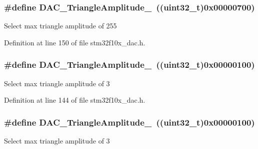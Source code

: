 \subsubsection[{\texorpdfstring{D\+A\+C\+\_\+\+Triangle\+Amplitude\+\_\+255}{DAC_TriangleAmplitude_255}}]{\setlength{\rightskip}{0pt plus 5cm}\#define D\+A\+C\+\_\+\+Triangle\+Amplitude\+\_~(({\bf uint32\+\_\+t})0x00000700)}\hypertarget{group___d_a_c__lfsrunmask__triangleamplitude_gadb404422c86a7b92d78e6d9617e8ce4d}{}\label{group___d_a_c__lfsrunmask__triangleamplitude_gadb404422c86a7b92d78e6d9617e8ce4d}
Select max triangle amplitude of 255 

Definition at line 150 of file stm32f10x\+\_\+dac.\+h.

\subsubsection[{\texorpdfstring{D\+A\+C\+\_\+\+Triangle\+Amplitude\+\_\+3}{DAC_TriangleAmplitude_3}}]{\setlength{\rightskip}{0pt plus 5cm}\#define D\+A\+C\+\_\+\+Triangle\+Amplitude\+\_~(({\bf uint32\+\_\+t})0x00000100)}\hypertarget{group___d_a_c__lfsrunmask__triangleamplitude_ga9798d68c3bbf0a57306bf2f962697377}{}\label{group___d_a_c__lfsrunmask__triangleamplitude_ga9798d68c3bbf0a57306bf2f962697377}
Select max triangle amplitude of 3 

Definition at line 144 of file stm32f10x\+\_\+dac.\+h.

\subsubsection[{\texorpdfstring{D\+A\+C\+\_\+\+Triangle\+Amplitude\+\_\+3}{DAC_TriangleAmplitude_3}}]{\setlength{\rightskip}{0pt plus 5cm}\#define D\+A\+C\+\_\+\+Triangle\+Amplitude\+\_~(({\bf uint32\+\_\+t})0x00000100)}\hypertarget{group___d_a_c__lfsrunmask__triangleamplitude_ga9798d68c3bbf0a57306bf2f962697377}{}\label{group___d_a_c__lfsrunmask__triangleamplitude_ga9798d68c3bbf0a57306bf2f962697377}
Select max triangle amplitude of 3 

